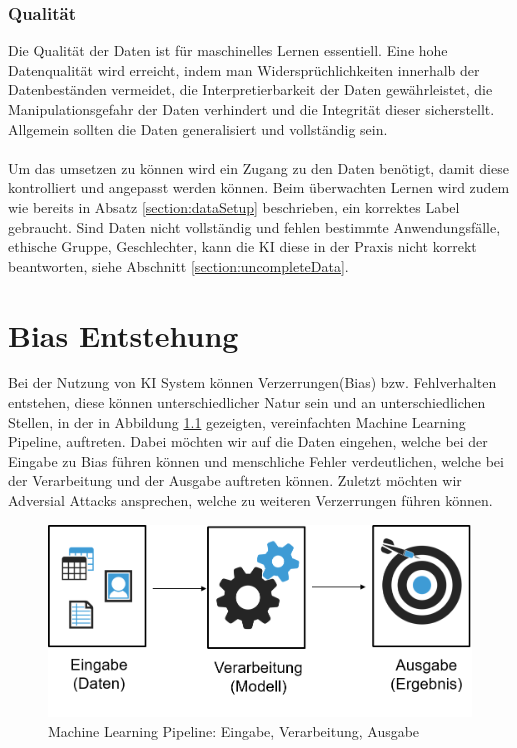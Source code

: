\documentclass[12pt,oneside,a4paper,parskip]{scrbook}
\begin{document}

\subsection{Qualität}
\label{section:DataQuality}

Die Qualität der Daten ist für maschinelles Lernen essentiell. Eine hohe Datenqualität wird erreicht, indem man Widersprüchlichkeiten innerhalb der Datenbeständen vermeidet, die Interpretierbarkeit der Daten gewährleistet, die Manipulationsgefahr der Daten verhindert und die Integrität dieser sicherstellt\cite{dataQuality}. Allgemein sollten die Daten generalisiert und vollständig sein.
\\\\
Um das umsetzen zu können wird ein Zugang zu den Daten benötigt, damit diese kontrolliert und angepasst werden können. Beim überwachten Lernen wird zudem wie bereits in Absatz \ref{section:dataSetup} beschrieben, ein korrektes Label gebraucht. Sind Daten nicht vollständig und fehlen bestimmte Anwendungsfälle, ethische Gruppe, Geschlechter, kann die KI diese in der Praxis nicht korrekt beantworten, siehe Abschnitt \ref{section:uncompleteData}.

\chapter{Bias Entstehung}
Bei der Nutzung von KI System können Verzerrungen(Bias) bzw. Fehlverhalten entstehen, diese können unterschiedlicher Natur sein und an unterschiedlichen Stellen, in der in Abbildung \ref{fig:dataBias} gezeigten, vereinfachten Machine Learning Pipeline, auftreten. Dabei möchten wir auf die Daten eingehen, welche bei der Eingabe zu Bias führen können und menschliche Fehler verdeutlichen, welche bei der Verarbeitung und der Ausgabe auftreten können. Zuletzt möchten wir Adversial Attacks ansprechen, welche zu weiteren Verzerrungen führen können.

\begin{figure}[h]
	\begin{center}
		\includegraphics[width=12cm]{Bilder/data_bias.png}
		\caption{Machine Learning Pipeline: Eingabe, Verarbeitung, Ausgabe}
		\label{fig:dataBias}
	\end{center}
\end{figure}
\end{document}
